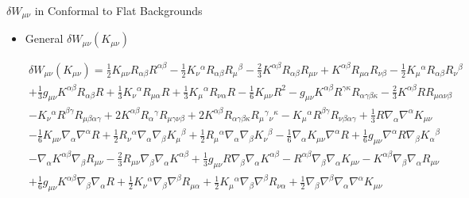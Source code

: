 \documentclass[8pt,aspectratio=1610]{beamer}
\begin{document}
\begin{frame}{$\delta W_{\mu\nu}$ in Conformal to Flat Backgrounds}
	\begin{itemize}
		\item General $\delta W_{\mu\nu}(K_{\mu\nu})$
	\end{itemize}
	\begin{eqnarray}
	&&\delta W_{\mu\nu}^{}(K_{\mu\nu})=\tfrac{1}{2} K_{\mu \nu} R_{\alpha \beta} R^{\alpha \beta} -  \tfrac{1}{2} K_{\nu}{}^{\alpha} R_{\alpha \beta} R_{\mu}{}^{\beta} -  \tfrac{2}{3} K^{\alpha \beta} R_{\alpha \beta} R_{\mu \nu} + K^{\alpha \beta} R_{\mu \alpha} R_{\nu \beta} -  \tfrac{1}{2} K_{\mu}{}^{\alpha} R_{\alpha \beta} R_{\nu}{}^{\beta} 
	\nonumber\\
	&&+ \tfrac{1}{3} g_{\mu \nu} K^{\alpha \beta} R_{\alpha \beta} R + \tfrac{1}{3} K_{\nu}{}^{\alpha} R_{\mu \alpha} R + \tfrac{1}{3} K_{\mu}{}^{\alpha} R_{\nu \alpha} R -  \tfrac{1}{6} K_{\mu \nu} R^2 -  g_{\mu \nu} K^{\alpha \beta} R^{\gamma \kappa} R_{\alpha \gamma \beta \kappa} -  \tfrac{2}{3} K^{\alpha \beta} R R_{\mu \alpha \nu \beta}
	\nonumber\\
	&& -  K_{\nu}{}^{\alpha} R^{\beta \gamma} R_{\mu \beta \alpha \gamma} + 2 K^{\alpha \beta} R_{\alpha}{}^{\gamma} R_{\mu \gamma \nu \beta} + 2 K^{\alpha \beta} R_{\alpha \gamma \beta \kappa} R_{\mu}{}^{\gamma}{}_{\nu}{}^{\kappa} -  K_{\mu}{}^{\alpha} R^{\beta \gamma} R_{\nu \beta \alpha \gamma} + \tfrac{1}{3} R \nabla_{\alpha}\nabla^{\alpha}K_{\mu \nu} 
	\nonumber\\
	&&-  \tfrac{1}{6} K_{\mu \nu} \nabla_{\alpha}\nabla^{\alpha}R + \tfrac{1}{2} R_{\nu}{}^{\alpha} \nabla_{\alpha}\nabla_{\beta}K_{\mu}{}^{\beta} + \tfrac{1}{2} R_{\mu}{}^{\alpha} \nabla_{\alpha}\nabla_{\beta}K_{\nu}{}^{\beta} 
	-  \tfrac{1}{6} \nabla_{\alpha}K_{\mu \nu} \nabla^{\alpha}R + \tfrac{1}{6} g_{\mu \nu} \nabla^{\alpha}R \nabla_{\beta}K_{\alpha}{}^{\beta} 
	\nonumber\\
	&&-  \nabla_{\alpha}K^{\alpha \beta} \nabla_{\beta}R_{\mu \nu} -  \tfrac{2}{3} R_{\mu \nu} \nabla_{\beta}\nabla_{\alpha}K^{\alpha \beta} + \tfrac{1}{3} g_{\mu \nu} R \nabla_{\beta}\nabla_{\alpha}K^{\alpha \beta} -  R^{\alpha \beta} \nabla_{\beta}\nabla_{\alpha}K_{\mu \nu} 
	-  K^{\alpha \beta} \nabla_{\beta}\nabla_{\alpha}R_{\mu \nu} 
	\nonumber\\
	&&+ \tfrac{1}{6} g_{\mu \nu} K^{\alpha \beta} \nabla_{\beta}\nabla_{\alpha}R + \tfrac{1}{2} K_{\nu}{}^{\alpha} \nabla_{\beta}\nabla^{\beta}R_{\mu \alpha} + \tfrac{1}{2} K_{\mu}{}^{\alpha} \nabla_{\beta}\nabla^{\beta}R_{\nu \alpha} + \tfrac{1}{2} \nabla_{\beta}\nabla^{\beta}\nabla_{\alpha}\nabla^{\alpha}K_{\mu \nu} 

\end{eqnarray}
\end{frame}
\end{document}
